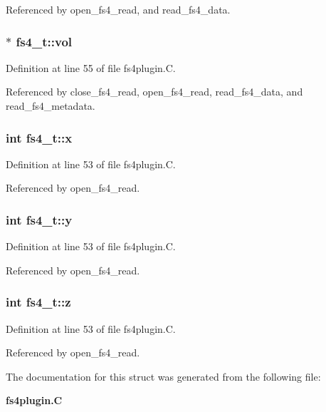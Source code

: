 Referenced by open\_\-fs4\_\-read, and read\_\-fs4\_\-data.
\subsubsection{$\ast$ fs4\_\-t::vol}\label{structfs4__t_m10}




Definition at line 55 of file fs4plugin.C.

Referenced by close\_\-fs4\_\-read, open\_\-fs4\_\-read, read\_\-fs4\_\-data, and read\_\-fs4\_\-metadata.
\subsubsection{\setlength{\rightskip}{0pt plus 5cm}int fs4\_\-t::x}\label{structfs4__t_m6}




Definition at line 53 of file fs4plugin.C.

Referenced by open\_\-fs4\_\-read.
\subsubsection{\setlength{\rightskip}{0pt plus 5cm}int fs4\_\-t::y}\label{structfs4__t_m7}




Definition at line 53 of file fs4plugin.C.

Referenced by open\_\-fs4\_\-read.
\subsubsection{\setlength{\rightskip}{0pt plus 5cm}int fs4\_\-t::z}\label{structfs4__t_m8}




Definition at line 53 of file fs4plugin.C.

Referenced by open\_\-fs4\_\-read.

The documentation for this struct was generated from the following file:\begin{CompactItemize}
\item 
{\bf fs4plugin.C}\end{CompactItemize}
